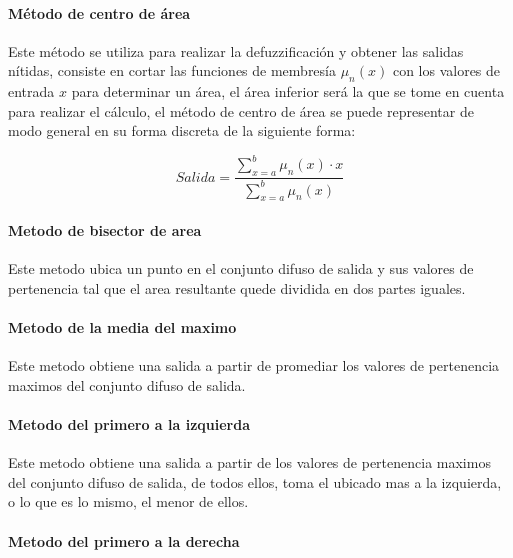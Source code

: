             \paragraph{Método de centro de área}

                Este método se utiliza para realizar la defuzzificación y obtener las salidas nítidas, consiste en cortar las funciones de membresía $\mu_{n}(x)$ con los valores de entrada $x$ para determinar un área, el área inferior será la que se tome en cuenta para realizar el cálculo, el método de centro de área se puede representar de modo general en su forma discreta de la siguiente forma:
                
                \begin{equation}\label{eq:Centroide}
                    Salida = \frac{\displaystyle\sum\limits_{x=a}^{b}\mu_{n}(x)\cdot x}{\displaystyle\sum\limits_{x=a}^{b}\mu_{n}(x)}
                \end{equation}

            \paragraph{Metodo de bisector de area}
                
                Este metodo ubica un punto en el conjunto difuso de salida y sus valores de pertenencia tal que el area resultante quede dividida en dos partes iguales.

            \paragraph{Metodo de la media del maximo}
                
                Este metodo obtiene una salida a partir de promediar los valores de pertenencia maximos del conjunto difuso de salida.

            \paragraph{Metodo del primero a la izquierda}
                
                Este metodo obtiene una salida a partir de los valores de pertenencia maximos del conjunto difuso de salida, de todos ellos, toma el ubicado mas a la izquierda, o lo que es lo mismo, el menor de ellos.
            
            \paragraph{Metodo del primero a la derecha}
                
